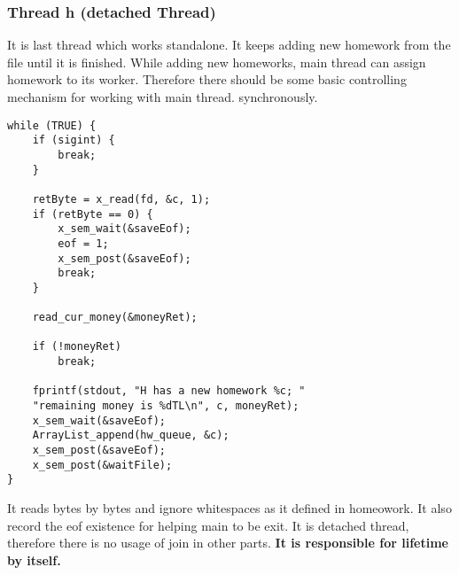 \documentclass{article}
\begin{document}
\subsubsection{Thread h (detached Thread)}
It is last thread which works standalone. It keeps adding new homework from the file until it is finished. While adding new homeworks, main thread can assign homework to its worker. Therefore there should be some basic controlling mechanism for working with main thread. synchronously.
\begin{lstlisting}[style=CStyle]
while (TRUE) {
    if (sigint) {
        break;
    }

    retByte = x_read(fd, &c, 1);
    if (retByte == 0) {
        x_sem_wait(&saveEof);
        eof = 1;
        x_sem_post(&saveEof);
        break;
    }

    read_cur_money(&moneyRet);

    if (!moneyRet)
        break;

    fprintf(stdout, "H has a new homework %c; "
    "remaining money is %dTL\n", c, moneyRet);
    x_sem_wait(&saveEof);
    ArrayList_append(hw_queue, &c);
    x_sem_post(&saveEof);
    x_sem_post(&waitFile);
}
\end{lstlisting}
It reads bytes by bytes and ignore whitespaces as it defined in homeowork. It also record the eof existence for helping main to be exit. It is detached thread, therefore there is no usage of join in other parts. \textbf{It is responsible for lifetime by itself.}
\\\\
\end{document}
